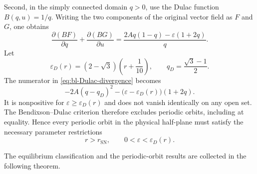 \documentclass[11pt,reqno]{amsart}
\theoremstyle{plain}
\theoremstyle{definition}
\theoremstyle{remark}
\begin{document}
Second, in the simply connected domain $q>0$, use the Dulac
function $B(q,u)=1/q$. Writing the two components of the
original vector field as $F$ and $G$, one obtains
\begin{equation}
\frac{\partial(BF)}{\partial q}
+
\frac{\partial(BG)}{\partial u}
=
\frac{
2Aq(1-q)-\varepsilon(1+2q)
}{
q
}.
\label{eq:bl-Dulac-divergence}
\end{equation}
Let
\begin{equation}
\varepsilon_D(r)
=
(2-\sqrt3)
\left(r+\frac{1}{10}\right),
\qquad
q_D=\frac{\sqrt3-1}{2}.
\label{eq:bl-Dulac-threshold}
\end{equation}
The numerator in \eqref{eq:bl-Dulac-divergence} becomes
\[
-2A(q-q_D)^2
-
\bigl(
\varepsilon-\varepsilon_D(r)
\bigr)(1+2q).
\]
It is nonpositive for
$\varepsilon\geq\varepsilon_D(r)$ and does not vanish
identically on any open set. The Bendixson--Dulac criterion
therefore excludes periodic orbits, including at equality.
Hence every periodic orbit in the physical half-plane must
satisfy the necessary parameter restrictions
\begin{equation}
\boxed{
r>r_{\mathrm{SN}},
\qquad
0<\varepsilon<\varepsilon_D(r).
}
\label{eq:bl-cycle-necessary-region}
\end{equation}

The equilibrium classification and the periodic-orbit results
are collected in the following theorem.
\end{document}
